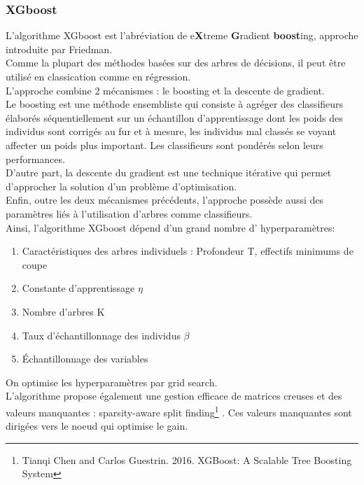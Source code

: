 \documentclass[french]{article}
\begin{document}
\begin{multicols}{2}
\subsubsection{XGboost}
L’algorithme XGboost est l'abréviation de e\textbf{X}treme \textbf{G}radient \textbf{boost}ing, approche introduite par Friedman.\\
Comme la plupart des méthodes basées sur des arbres de décisions, il peut être utilisé en classication comme en régression.\\
L'approche combine 2 mécanismes : le boosting et la descente de gradient.\\
Le boosting est une méthode ensembliste qui consiste à agréger des classifieurs élaborés séquentiellement sur un échantillon d’apprentissage dont les poids des individus sont corrigés au fur et à mesure, les individus mal classés se voyant affecter un poids plus important. Les classifieurs sont pondérés selon leurs performances.\\
D'autre part, la descente du gradient est une technique itérative qui permet d’approcher la solution d’un problème d’optimisation.\\
Enfin, outre les deux mécanismes précédents, l’approche possède aussi des paramètres liés à l’utilisation d’arbres comme classifieurs.\\
Ainsi, l’algorithme XGboost dépend d’un grand nombre d' hyperparamètres: 
\begin{enumerate}
    \item Caractéristiques des
arbres individuels : Profondeur T, effectifs minimums de coupe 
\item Constante
d'apprentissage $\eta$
\item Nombre d'arbres K
\item Taux d'échantillonnage des individus $\beta$
\item Échantillonnage des variables
\end{enumerate}
On optimise les hyperparamètres par grid search.\\
L'algorithme propose également une gestion efficace de matrices creuses et des valeurs manquantes : \og sparsity-aware split finding\footnote{\cite{chen2016xgboost} Tianqi Chen and Carlos Guestrin. 2016. XGBoost: A Scalable Tree Boosting System} \fg{}. Ces valeurs manquantes sont dirigées vers le noeud qui optimise le gain.


\end{multicols}
\end{document}

